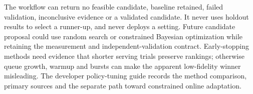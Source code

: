 The workflow can return no feasible candidate, baseline retained, failed
validation, inconclusive evidence or a validated candidate. It never uses holdout
results to select a runner-up, and never deploys a setting. Future candidate
proposal could use random search or constrained Bayesian optimization while
retaining the measurement and independent-validation contract. Early-stopping
methods need evidence that shorter serving trials preserve rankings; otherwise
queue growth, warmup and bursts can make the apparent low-fidelity winner
misleading. The developer policy-tuning guide records the method comparison,
primary sources and the separate path toward constrained online adaptation.
